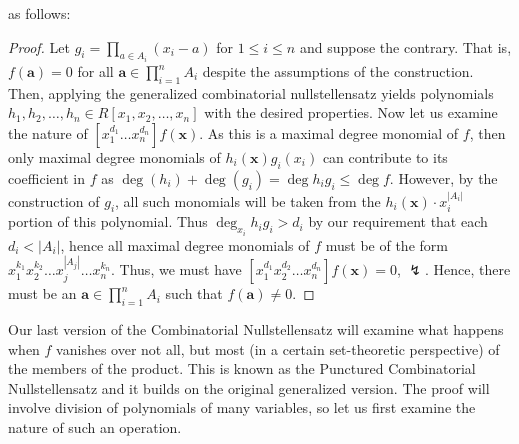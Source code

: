 	as follows: \begin{proof}[Proof] Let $g_i = \prod_{a \in A_i}^{} \left(
		x_{i} - a \right) $ for $1 \le i \le n$ and suppose the
		contrary. That is, $f\left( \textbf{a} \right) = 0$ for all $
		\textbf{a} \in \prod_{i= 1}^{n} A_i $ despite the assumptions of the construction. Then, applying the
		generalized combinatorial nullstellensatz yields polynomials
		$h_1, h_2, \ldots, h_n \in R[x_1, x_2, \ldots, x_{n}]$ with the
		desired properties. Now let us examine the nature of
		$[x_1^{d_1}\ldots x_{n}^{ d_n}] f\left( \textbf{x} \right) $.
		As this is a maximal degree monomial of $f$, then only maximal
		degree monomials of $h_i \left( \textbf{x} \right)  g_i \left(
		x_i \right) $ can contribute to its coefficient in $f$ as $\deg \left( h_{i} \right) + \deg \left( g_{i} \right) = \deg
		h_i g_i \le \deg f$. However, by the construction of $g_i$, all
		such monomials will be taken from the $h_i \left( \textbf{x}
		\right) \cdot x_i ^{ \left| A_i \right| } $ portion of this
		polynomial. Thus $\deg _{x_{i}} h_i g_i> d_i$ by our
		requirement that each  $d_i < \left| A_i \right| $, hence all
	maximal degree monomials of $f$ must be of the form
$x_1^{k_1}x_2^{k_2}\ldots x_{j}^{\left| A_j \right|} \ldots x_{n}^{ k_n}$.
Thus, we must have $[x_1^{d_1}x_2^{d_2}\ldots x_{n}^{d_n}] f\left( \textbf{x}
\right) = 0$, $\lightning$. Hence, there must be an $ \textbf{a} \in \prod_{i=
1}^{n} A_i $ such that $f\left( \textbf{a} \right) \neq 0$.  \end{proof} Our
last version of the Combinatorial Nullstellensatz will examine what happens
when $f$ vanishes over not all, but most (in a certain set-theoretic
perspective) of the members of the product. This is known as the Punctured
Combinatorial Nullstellensatz and it builds on the original generalized
version. The proof will involve division of polynomials of many variables, so
let us first examine the nature of such an operation.
\newpage
